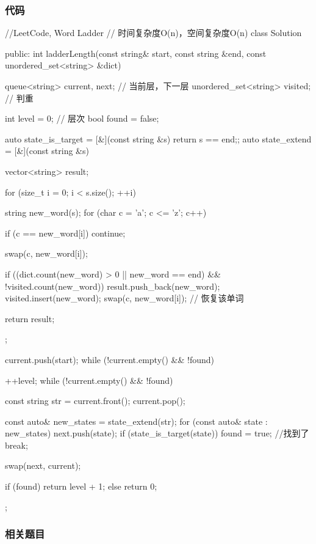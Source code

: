 \subsubsection{代码}
\begin{Code}
//LeetCode, Word Ladder
// 时间复杂度O(n)，空间复杂度O(n)
class Solution {
public:
    int ladderLength(const string& start, const string &end,
            const unordered_set<string> &dict) {
        queue<string> current, next;    // 当前层，下一层
        unordered_set<string> visited;  // 判重

        int level = 0;  // 层次
        bool found = false;

        auto state_is_target = [&](const string &s) {return s == end;};
        auto state_extend = [&](const string &s) {
            vector<string> result;

            for (size_t i = 0; i < s.size(); ++i) {
                string new_word(s);
                for (char c = 'a'; c <= 'z'; c++) {
                    if (c == new_word[i]) continue;

                    swap(c, new_word[i]);

                    if ((dict.count(new_word) > 0 || new_word == end) &&
                            !visited.count(new_word)) {
                        result.push_back(new_word);
                        visited.insert(new_word);
                    }
                    swap(c, new_word[i]); // 恢复该单词
                }
            }

            return result;
        };

        current.push(start);
        while (!current.empty() && !found) {
            ++level;
            while (!current.empty() && !found) {
                const string str = current.front();
                current.pop();

                const auto& new_states = state_extend(str);
                for (const auto& state : new_states) {
                    next.push(state);
                    if (state_is_target(state)) {
                        found = true; //找到了
                        break;
                    }
                }
            }
            swap(next, current);
        }
        if (found) return level + 1;
        else return 0;
    }
};
\end{Code}


\subsubsection{相关题目}


